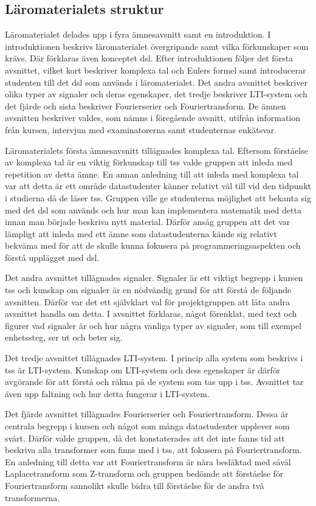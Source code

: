 \documentclass[12pt,a4paper,twoside,openright]{article}
\begin{document}
\subsection{Läromaterialets struktur}
\label{sec:struktur}
Läromaterialet delades upp i fyra ämnesavsnitt samt en introduktion. I
introduktionen beskrivs läromaterialet övergripande samt vilka
förkunskaper som krävs. Där förklaras även konceptet \gls{dsl}. Efter
introduktionen följer det första avsnittet, vilket kort beskriver
komplexa tal och Eulers formel samt introducerar studenten till det
\gls{dsl} som används i läromaterialet. Det andra avsnittet beskriver
olika typer av signaler och deras egenskaper, det tredje beskriver
LTI-system och det fjärde och sista beskriver Fourierserier och
Fouriertransform. De ämnen avsnitten beskriver valdes, som nämns i
föregående avsnitt, utifrån information från kursen, intervjun med
examinatorerna samt studenternas enkätsvar.

Läromaterialets första ämnesavsnitt tillägnades komplexa tal. Eftersom
förståelse av komplexa tal är en viktig förkunskap till \gls{tss}
valde gruppen att inleda med repetition av detta ämne. En annan
anledning till att inleda med komplexa tal var att detta är ett område
datastudenter känner relativt väl till vid den tidpunkt i studierna då
de läser \gls{tss}. Gruppen ville ge studenterna möjlighet att bekanta
sig med det \gls{dsl} som används och hur man kan implementera
matematik med detta innan man började beskriva nytt material. Därför
ansåg gruppen att det var lämpligt att inleda med ett ämne som
datastudenterna kände sig relativt bekväma med för att de skulle kunna
fokusera på programmeringsaspekten och förstå upplägget med \gls{dsl}.

Det andra avsnittet tillägnades signaler. Signaler är ett viktigt
begrepp i kursen \gls{tss} och kunskap om signaler är en nödvändig
grund för att förstå de följande avsnitten. Därför var det ett
självklart val för projektgruppen att låta andra avsnittet handla om
detta. I avsnittet förklaras, något förenklat, med text och figurer
vad signaler är och hur några vanliga typer av signaler, som till
exempel enhetssteg, ser ut och beter sig.

Det tredje avsnittet tillägnades LTI-system. I princip alla system som
beskrivs i \gls{tss} är LTI-system. Kunskap om LTI-system och dess
egenskaper är därför avgörande för att förstå och räkna på de system
som tas upp i \gls{tss}. Avsnittet tar även upp faltning och hur detta
fungerar i LTI-system.

Det fjärde avsnittet tillägnades Fourierserier och
Fouriertransform. Dessa är centrala begrepp i kursen och något som
många datastudenter upplever som svårt. Därför valde gruppen, då det
konstaterades att det inte fanns tid att beskriva alla transformer som
finns med i \gls{tss}, att fokusera på Fouriertransform. En anledning
till detta var att Fouriertransform är nära besläktad med såväl
Laplacetransform som Z-transform och gruppen bedömde att förståelse
för Fouriertransform sannolikt skulle bidra till förståelse för de
andra två transformerna.
\end{document}
